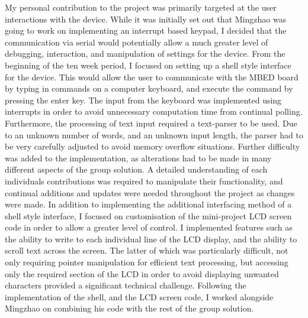 My personal contribution to the project was primarily targeted at the user 
interactions with the device. While it was initially set out that Mingzhao was 
going to work on implementing an interrupt based keypad, I decided that the 
communication via serial would potentially allow a much greater level of 
debugging, interaction, and manipulation of settings for the device. From the 
beginning of the ten week period, I focused on setting up a shell style interface 
for the device. This would allow the user to communicate with the MBED board by 
typing in commands on a computer keyboard, and execute the command by pressing 
the enter key. The input from the keyboard was implemented using interrupts in 
order to avoid unnecessary computation time from continual polling. 
Furthermore, the processing of text input required a text-parser to be used. 
Due to an unknown number of words, and an unknown input length, the parser had 
to be very carefully adjusted to avoid memory overflow situations. Further 
difficulty was added to the implementation, as alterations had to be made in many 
different aspects of the group solution. A detailed understanding of each 
individuals contributions was required to manipulate their functionality, and 
continual additions and updates were needed throughout the project as changes 
were made. 
In addition to implementing the additional interfacing method of a shell style 
interface, I focused on customisation of the mini-project LCD screen code in 
order to allow a greater level of control. I implemented features such as the 
ability to write to each individual line of the LCD display, and the ability to 
scroll text across the screen. 
The latter of which was particularly difficult, not only requiring pointer 
manipulation for efficient text processing, but accessing only the required 
section of the LCD in order to avoid displaying unwanted characters provided 
a significant technical challenge. Following the implementation of the shell, and 
the LCD screen code, 
I worked alongside Mingzhao on combining his code with 
the rest of the group solution. 

